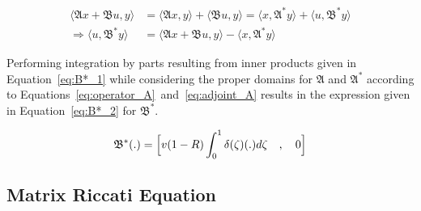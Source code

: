 \begin{equation} \label{eq:B*_1}
    \begin{aligned}
        \langle \mathfrak{A} x + \mathfrak{B} u, y \rangle
        &= \langle \mathfrak{A} x, y \rangle
        + \langle \mathfrak{B} u, y \rangle
        = \langle x, \mathfrak{A}^* y\rangle
        + \langle u, \mathfrak{B}^* y \rangle \\
        \Rightarrow \langle u, \mathfrak{B}^* y \rangle
        &= \langle \mathfrak{A} x + \mathfrak{B} u, y \rangle
        - \langle x, \mathfrak{A}^* y\rangle
    \end{aligned}
\end{equation}

Performing integration by parts resulting from inner products given in Equation~\ref{eq:B*_1} while considering the proper domains for $\mathfrak{A}$ and $\mathfrak{A}^*$ according to Equations~\ref{eq:operator_A}~and~\ref{eq:adjoint_A} results in the expression given in Equation~\ref{eq:B*_2} for $\mathfrak{B}^*$.

\begin{equation} \label{eq:B*_2}
    \mathfrak{B}^* (.) = \Bigl[ v(1-R) \int_0^1 \delta(\zeta) (.) d\zeta \quad , \quad 0 \Bigr]
\end{equation}

\subsection{Matrix Riccati Equation}

